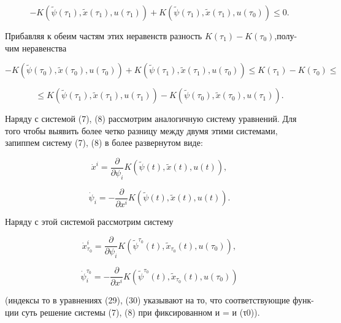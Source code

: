 \documentclass[10pt]{article}
\begin{document}
\[
- K\left( {\widetilde{\psi }\left( {\tau }_{1}\right),\widetilde{x}\left( {\tau }_{1}\right),u\left( {\tau }_{1}\right) }\right)  + K\left( {\widetilde{\psi }\left( {\tau }_{1}\right),\widetilde{x}\left( {\tau }_{1}\right),u\left( {\tau }_{0}\right) }\right)  \leq  0.
\]

Прибавляя к обеим частям этих неравенств разность \(K\left( {\tau }_{1}\right)  - K\left( {\tau }_{0}\right)\),полу- чим неравенства

\[
- K\left( {\widetilde{\psi }\left( {\tau }_{0}\right),\widetilde{x}\left( {\tau }_{0}\right),u\left( {\tau }_{0}\right) }\right)  + K\left( {\widetilde{\psi }\left( {\tau }_{1}\right),\widetilde{x}\left( {\tau }_{1}\right),u\left( {\tau }_{0}\right) }\right)  \leq  K\left( {\tau }_{1}\right)  - K\left( {\tau }_{0}\right)  \leq
\]

\[
\leq  K\left( {\widetilde{\psi }\left( {\tau }_{1}\right),\widetilde{x}\left( {\tau }_{1}\right),u\left( {\tau }_{1}\right) }\right)  - K\left( {\widetilde{\psi }\left( {\tau }_{0}\right),\widetilde{x}\left( {\tau }_{0}\right),u\left( {\tau }_{1}\right) }\right). \tag{26}
\]

Наряду с системой (7), (8) рассмотрим аналогичную систему уравнений. Для того чтобы выявить более четко разницу между двумя этими системами, запиппем систему (7), (8) в более развернутом виде:

\[
{\dot{x}}^{i} = \frac{\partial }{\partial {\psi }_{i}}K\left( {\widetilde{\psi }\left( t\right),\widetilde{x}\left( t\right),u\left( t\right) }\right), \tag{27}
\]

\[
{\dot{\psi }}_{i} =  - \frac{\partial }{\partial {x}^{i}}K\left( {\widetilde{\psi }\left( t\right),\widetilde{x}\left( t\right),u\left( t\right) }\right). \tag{28}
\]

Наряду с этой системой рассмотрим систему

\[
{\dot{x}}_{{\tau }_{0}}^{i} = \frac{\partial }{\partial {\psi }_{i}}K\left( {{\widetilde{\psi }}^{{\tau }_{0}}\left( t\right),{\widetilde{x}}_{{\tau }_{0}}\left( t\right),u\left( {\tau }_{0}\right) }\right), \tag{29}
\]

\[
{\dot{\psi }}_{i}^{{\tau }_{0}} =  - \frac{\partial }{\partial {x}^{i}}K\left( {{\widetilde{\psi }}^{{\tau }_{0}}\left( t\right),{\widetilde{x}}_{{\tau }_{0}}\left( t\right),u\left( {\tau }_{0}\right) }\right) \tag{30}
\]

(индексы то в уравнениях (29), (30) указывают на то, что соответствующие функ- ции суть решение системы (7), (8) при фиксированном и = и (τ0)).
\end{document}
